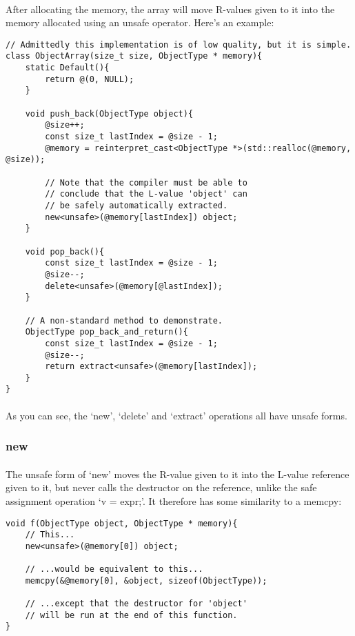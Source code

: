 \documentclass[12pt,twoside,notitlepage]{report}
\begin{document}
\paragraph{}
After allocating the memory, the array will move R-values given to it into the memory allocated using an unsafe operator. Here's an example:

\begin{lstlisting}
// Admittedly this implementation is of low quality, but it is simple.
class ObjectArray(size_t size, ObjectType * memory){
	static Default(){
		return @(0, NULL);
	}
	
	void push_back(ObjectType object){
		@size++;
		const size_t lastIndex = @size - 1;
		@memory = reinterpret_cast<ObjectType *>(std::realloc(@memory, @size));
		
		// Note that the compiler must be able to
		// conclude that the L-value 'object' can
		// be safely automatically extracted.
		new<unsafe>(@memory[lastIndex]) object;
	}
	
	void pop_back(){
		const size_t lastIndex = @size - 1;
		@size--;
		delete<unsafe>(@memory[@lastIndex]);
	}
	
	// A non-standard method to demonstrate.
	ObjectType pop_back_and_return(){
		const size_t lastIndex = @size - 1;
		@size--;
		return extract<unsafe>(@memory[lastIndex]);
	}
}
\end{lstlisting}

\paragraph{}
As you can see, the `new', `delete' and `extract' operations all have unsafe forms.

\subsubsection{new}

\paragraph{}
The unsafe form of `new' moves the R-value given to it into the L-value reference given to it, but never calls the destructor on the reference, unlike the safe assignment operation `v = expr;'. It therefore has some similarity to a memcpy:

\begin{lstlisting}
void f(ObjectType object, ObjectType * memory){
	// This...
	new<unsafe>(@memory[0]) object;
	
	// ...would be equivalent to this...
	memcpy(&@memory[0], &object, sizeof(ObjectType));
	
	// ...except that the destructor for 'object'
	// will be run at the end of this function.
}
\end{lstlisting}
\end{document}
